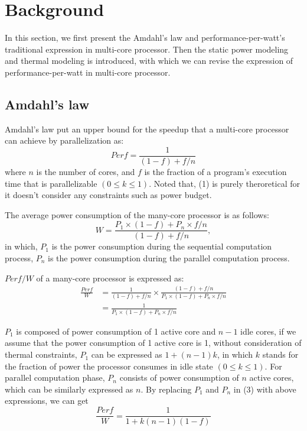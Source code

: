 \section{Background}
In this section, we first present the Amdahl's law and performance-per-watt's traditional expression in multi-core processor. Then the static power modeling and thermal modeling is introduced, with which we can revise the expression of performance-per-watt in multi-core processor.

\subsection{Amdahl's law}
Amdahl's law put an upper bound for the speedup that a multi-core processor can achieve by parallelization as:
\begin{equation}\label{speedup}
Perf = \frac{1} {(1-f)+f/n}
\end{equation}
where $n$ is the number of cores, and $f$ is the fraction of a program's execution time that is parallelizable $(0 \le k \le 1)$. Noted that, (1) is purely theroretical for it doesn't consider any constraints such as power budget.

The average power consumption of the many-core processor is as follows:
\begin{equation}\label{average_power}
W = \frac{P_{1} \times (1-f)+P_{n} \times f/n}{(1-f)+f/n},
\end{equation}
in which, $P_{1}$ is the power consumption during the sequential computation process, $P_{n}$ is the power consumption during the parallel computation process.

$Perf/W$ of a many-core processor is expressed as:
\begin{equation}\label{ppw}
\begin{split}
\frac{Perf}{W} &= \frac{1}{(1-f)+f/n} \times \frac{(1-f)+f/n}{P_{1} \times (1-f)+P_{n} \times f/n}\\
&= \frac{1}{P_{1} \times (1-f)+P_{n} \times f/n}
\end{split}
\end{equation}

$P_{1}$ is composed of power consumption of 1 active core and $n-1$ idle cores, if we assume that the power consumption of 1 active core is 1, without consideration of thermal constraints, $P_{1}$ can be expressed as $1+(n-1)k$, in which $k$ stands for the fraction of power the processor consumes in idle state $(0 \le k \le 1)$. For parallel computation phase, $P_{n}$ consists of power consumption of $n$ active cores, which can be similarly expressed as $n$. By replacing $P_{1}$ and $P_{n}$ in (3) with above expressions, we can get
\begin{equation}\label{ppw}
\frac{Perf}{W} = \frac{1}{1+k(n-1)(1-f)}
\end{equation}


